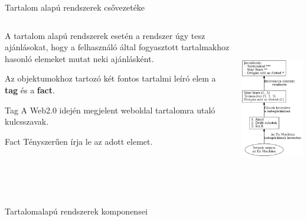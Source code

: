 \documentclass[english, aspectratio=169]{beamer}
\begin{document}
\begin{frame}{Tartalom alapú rendszerek csővezetéke}
\begin{columns}
\begin{column}{.5\textwidth}
A tartalom alapú rendszerek esetén a rendszer úgy tesz ajánlásokat, hogy a felhasználó által fogyasztott tartalmakhoz hasonló elemeket mutat neki ajánlásként.\par\smallskip
Az objektumokhoz tartozó két fontos tartalmi leíró elem a \textbf{tag} és a \textbf{fact}.\par\smallskip
\begin{block}{Tag}
A Web2.0 idején megjelent weboldal tartalomra utaló kulcsszavak.
\end{block}
\begin{block}{Fact}
Tényszerűen írja le az adott elemet.
\end{block}
\end{column}
\begin{column}{.5\textwidth}
\begin{center}
\includegraphics[width=7cm, height=7cm, keepaspectratio]{graphs/recommender_7.png}
\end{center}
\end{column}
\end{columns}
\end{frame}

\begin{frame}{Tartalomalapú rendszerek komponensei}
\begin{columns}
\begin{column}{.5\textwidth}
\end{column}
\begin{column}{.5\textwidth}

\end{column}
\end{columns}
\end{frame}
\end{document}
